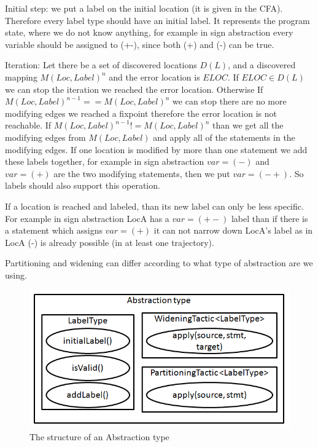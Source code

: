 Initial step: we put a label on the initial location (it is given in the CFA). Therefore every label type should have an initial label. It represents the program state, where we do not know anything, for example in sign abstraction every variable should be assigned to (+-), since both (+) and (-) can be true.

Iteration:
Let there be a set of discovered locations $D(L)$, and a discovered mapping $M(Loc, Label)^{n}$ and the error location is $ELOC$.
If $ELOC \in D(L)$ we can stop the iteration we reached the error location.
Otherwise If $M(Loc, Label)^{n-1} == M(Loc, Label)^{n}$ we can stop there are no more modifying edges we reached a fixpoint therefore the error location is not reachable.
If $M(Loc, Label)^{n-1} != M(Loc, Label)^{n}$ than we get all the modifying edges from $M(Loc, Label)$ and apply all of the statements in the modifying edges.
If one location is modified by more than one statement we add these labels together, for example in sign abstraction $var=(-)$ and $var=(+)$ are the two modifying statements, then we put $var=(-+)$. So labels should also support this operation. 

If a location is reached and labeled, than its new label can only be less specific.
For example in sign abstraction LocA has a $var=(+-)$ label than if there is a statement which assigns $var=(+)$ it can not narrow down LocA's label as in LocA (-) is already possible (in at least one trajectory).

Partitioning and widening can differ according to what type of abstraction are we using.

\begin{figure} [!ht]
	\centering
	\includegraphics[width=150mm, keepaspectratio]{figures/abstractiontype.png}
	\caption{\label{fig:abstype} The structure of an Abstraction type}
\end{figure}








